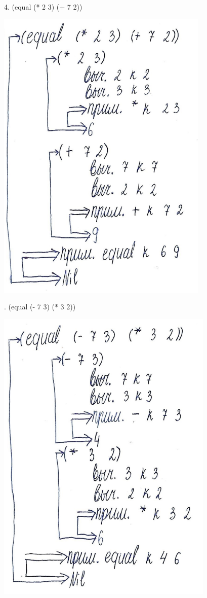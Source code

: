 \documentclass[12pt]{report}
\begin{document}
4. (equal (* 2 3) (+ 7 2))

\includegraphics[scale=1.5]{img/1.4}

. (equal (- 7 3) (* 3 2))

\includegraphics[scale=1]{img/1.5}
\end{document}
